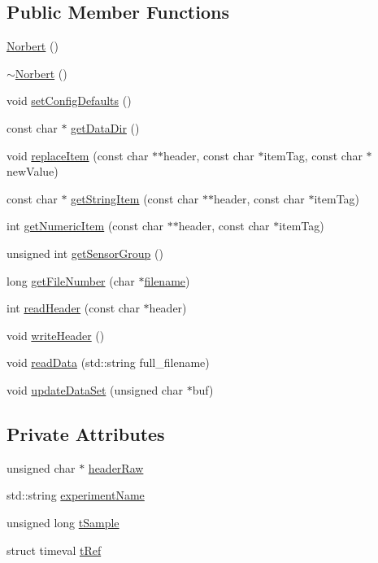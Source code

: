 \subsection*{Public Member Functions}
\begin{DoxyCompactItemize}
\item 
\hyperlink{classNorbert_a113d6cad08c22aafd3e63ccee4841f90}{Norbert} ()
\item 
\hyperlink{classNorbert_a27bd1709c30873d5438653789c6a6c6e}{$\sim$\-Norbert} ()
\item 
void \hyperlink{classNorbert_a3144651319dd271f84757d1ea1669ba1}{set\-Config\-Defaults} ()
\item 
const char $\ast$ \hyperlink{classNorbert_a8b111e6c53af877a765b9c9938a841b9}{get\-Data\-Dir} ()
\item 
void \hyperlink{classNorbert_a6a794ac4b3102bc7d857518c2c09ceff}{replace\-Item} (const char $\ast$$\ast$header, const char $\ast$item\-Tag, const char $\ast$new\-Value)
\item 
const char $\ast$ \hyperlink{classNorbert_a9445ec735a568ebd487ae750e709eae7}{get\-String\-Item} (const char $\ast$$\ast$header, const char $\ast$item\-Tag)
\item 
int \hyperlink{classNorbert_a10bcb21bf14fc71f916edd8ff0583c73}{get\-Numeric\-Item} (const char $\ast$$\ast$header, const char $\ast$item\-Tag)
\item 
unsigned int \hyperlink{classNorbert_a87b849c0c5fa73636de5e413f17033b7}{get\-Sensor\-Group} ()
\item 
long \hyperlink{classNorbert_a1f346f31e3c69c956a3a177ca13fed91}{get\-File\-Number} (char $\ast$\hyperlink{classDAQDevice_a7f9cda7cf5b41f6b134c313477e9644b}{filename})
\item 
int \hyperlink{classNorbert_a522857eace03f70822689acf6ad0e6eb}{read\-Header} (const char $\ast$header)
\item 
void \hyperlink{classNorbert_a0f0cf702bcacd76ab4d68d0334443bbe}{write\-Header} ()
\item 
void \hyperlink{classNorbert_a0b1b1ba6fc63b8662a537c66815ff19b}{read\-Data} (std\-::string full\-\_\-filename)
\item 
void \hyperlink{classNorbert_a2187d668d3c73ad112c223b82460064b}{update\-Data\-Set} (unsigned char $\ast$buf)
\end{DoxyCompactItemize}
\subsection*{Private Attributes}
\begin{DoxyCompactItemize}
\item 
unsigned char $\ast$ \hyperlink{classNorbert_a6f35c603a911f44e8d436bfa3ee3d166}{header\-Raw}
\item 
std\-::string \hyperlink{classNorbert_a7970cd046899ac6ae80af302650ac0de}{experiment\-Name}
\item 
unsigned long \hyperlink{classNorbert_ad046d88d69a2c5e0eb93e7f1b26bc5fd}{t\-Sample}
\item 
struct timeval \hyperlink{classNorbert_ac6365eaac8871d1af382adf9700b3e82}{t\-Ref}
\end{DoxyCompactItemize}
